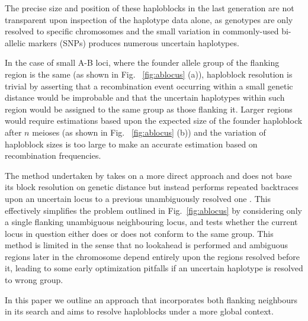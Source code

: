 The precise size and position of these haploblocks in the last generation are not transparent upon inspection of the haplotype data alone, as genotypes are only resolved to specific chromosomes and the small variation in commonly-used bi-allelic markers (SNPs) produces numerous uncertain haplotypes.\

In the case of small A-B loci, where the founder allele group of the flanking region is the same (as shown in Fig. ~\ref{fig:ablocus} (a)), haploblock resolution is trivial by asserting that a recombination event occurring within a small genetic distance would be improbable and that the uncertain haplotypes within such region would be assigned to the same group as those flanking it. Larger regions would require estimations based upon the expected size of the founder haploblock after $n$ meioses (as shown in Fig. ~\ref{fig:ablocus} (b)) and the variation of haploblock sizes is too large to make an accurate estimation based on recombination frequencies.

The method undertaken by \app takes on a more direct approach and does not base its block resolution on genetic distance but instead performs repeated backtraces upon an uncertain locus to a previous unambiguously resolved one \citep{hpaint,hpaintmanual}. This effectively simplifies the problem outlined in Fig.~\ref{fig:ablocus} by considering only a single flanking unambiguous neighbouring locus, and tests whether the current locus in question either does or does not conform to the same group. This method is limited in the sense that no lookahead is performed and ambiguous regions later in the chromosome depend entirely upon the regions resolved before it, leading to some early optimization pitfalls if an uncertain haplotype is resolved to wrong group.


In this paper we outline an approach that incorporates both flanking neighbours in its search and aims to resolve haploblocks under a more global context.